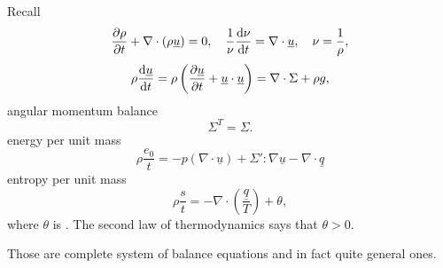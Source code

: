 \documentclass[11pt,oneside]{book}
\renewcommand{\vec}[1]{\underline{#1}}
\theoremstyle{definition} %
\theoremstyle{plain} %
\theoremstyle{remark} %
\theoremstyle{underline}
\begin{document}
  Recall
  \begin{displaymath}
    \ptf{\rho}{t} + \nabla \cdot (\rho \vec u) = 0,  
    \quad \frac{1}{\nu} \dfrac{\nu}{t} = \nabla \cdot \vec u, 
    \quad \nu = \frac{1}{\rho},
  \end{displaymath}
  \begin{displaymath}
    \rho \dfrac{\vec u }{t} = \rho \left(  \ptf{\vec u}{t} + \vec u \cdot \vec u \right) = \nabla \cdot \Sigma  + \rho g,
  \end{displaymath}
  angular momentum balance
  \begin{displaymath}
    \Sigma^T = \Sigma.
  \end{displaymath}
  energy per unit mass
  \begin{displaymath}
    \rho \dfrac{e_0}{t} = - p (\nabla \cdot \vec u) + \Sigma' : \nabla \vec u - \nabla \cdot \vec q
  \end{displaymath}
  entropy per unit mass
  \begin{displaymath}
    \rho \dfrac{s}{t} = - \nabla \cdot \left( \frac{\vec q }{T} \right) + \theta,
  \end{displaymath}
  where $\theta$ is . The second law of thermodynamics says that $\theta > 0 $.

  Those are complete system of balance equations and in fact quite general ones.
\end{document}
